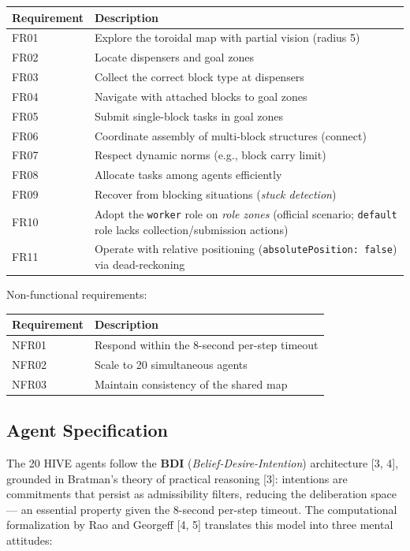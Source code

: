 \documentclass[11pt,a4paper]{article}
\newcommand{\code}[1]{\texttt{#1}}
\begin{document}
\begin{table}[H]
\centering
\begin{tabularx}{\linewidth}{lX}
\toprule
\textbf{Requirement} & \textbf{Description} \\
\midrule
FR01 & Explore the toroidal map with partial vision (radius 5) \\
FR02 & Locate dispensers and goal zones \\
FR03 & Collect the correct block type at dispensers \\
FR04 & Navigate with attached blocks to goal zones \\
FR05 & Submit single-block tasks in goal zones \\
FR06 & Coordinate assembly of multi-block structures (connect) \\
FR07 & Respect dynamic norms (e.g., block carry limit) \\
FR08 & Allocate tasks among agents efficiently \\
FR09 & Recover from blocking situations (\emph{stuck detection}) \\
FR10 & Adopt the \code{worker} role on \emph{role zones} (official scenario; \code{default} role lacks collection/submission actions) \\
FR11 & Operate with relative positioning (\code{absolutePosition: false}) via dead-reckoning \\
\bottomrule
\end{tabularx}
\end{table}

\noindent Non-functional requirements:

\begin{table}[H]
\centering
\begin{tabularx}{\linewidth}{lX}
\toprule
\textbf{Requirement} & \textbf{Description} \\
\midrule
NFR01 & Respond within the 8-second per-step timeout \\
NFR02 & Scale to 20 simultaneous agents \\
NFR03 & Maintain consistency of the shared map \\
\bottomrule
\end{tabularx}
\end{table}

\subsection{Agent Specification}
The 20 HIVE agents follow the \textbf{BDI} (\emph{Belief-Desire-Intention}) architecture [3, 4], grounded in Bratman's theory of practical reasoning [3]: intentions are commitments that persist as admissibility filters, reducing the deliberation space --- an essential property given the 8-second per-step timeout. The computational formalization by Rao and Georgeff [4, 5] translates this model into three mental attitudes:
\end{document}
